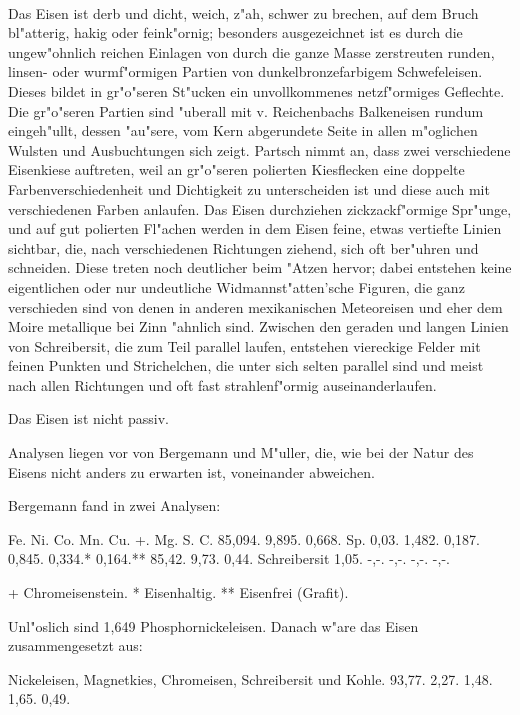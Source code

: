 \documentclass[a4paper, 11pt, oneside]{article}
\begin{document}
\paragraph{}
Das Eisen ist derb und dicht, weich, z"ah, schwer zu brechen, auf dem Bruch bl"atterig, hakig oder feink"ornig; besonders ausgezeichnet ist es durch die ungew"ohnlich reichen Einlagen von durch die ganze Masse zerstreuten runden, linsen- oder wurmf"ormigen Partien von dunkelbronzefarbigem Schwefeleisen. Dieses bildet in gr"o"seren St"ucken ein unvollkommenes netzf"ormiges Geflechte. Die gr"o"seren Partien sind "uberall mit v. Reichenbachs Balkeneisen rundum eingeh"ullt, dessen "au"sere, vom Kern abgerundete Seite in allen m"oglichen Wulsten und Ausbuchtungen sich zeigt. Partsch nimmt an, dass zwei verschiedene Eisenkiese auftreten, weil an gr"o"seren polierten Kiesflecken eine doppelte Farbenverschiedenheit und Dichtigkeit zu unterscheiden ist und diese auch mit verschiedenen Farben anlaufen. Das Eisen durchziehen zickzackf"ormige Spr"unge, und auf gut polierten Fl"achen werden in dem Eisen feine, etwas vertiefte Linien sichtbar, die, nach verschiedenen Richtungen ziehend, sich oft ber"uhren und schneiden. Diese treten noch deutlicher beim "Atzen hervor; dabei entstehen keine eigentlichen oder nur undeutliche Widmannst"atten'sche Figuren, die ganz verschieden sind von denen in anderen mexikanischen Meteoreisen und eher dem Moire metallique bei Zinn "ahnlich sind. Zwischen den geraden und langen Linien von Schreibersit, die zum Teil parallel laufen, entstehen viereckige Felder mit feinen Punkten und Strichelchen, die unter sich selten parallel sind und meist nach allen Richtungen und oft fast strahlenf"ormig auseinanderlaufen.

Das Eisen ist nicht passiv.

Analysen liegen vor von Bergemann und M"uller, die, wie bei der Natur des Eisens nicht anders zu erwarten ist, voneinander abweichen.

Bergemann fand in zwei Analysen:

Fe. Ni. Co. Mn. Cu. +. Mg. S. C.  
85,094. 9,895. 0,668. Sp. 0,03. 1,482. 0,187. 0,845. {0,334.* 0,164.**}  
85,42. 9,73. 0,44. Schreibersit 1,05. -,-. -,-. -,-. -,-.

+ Chromeisenstein.  
* Eisenhaltig.  
** Eisenfrei (Grafit).

Unl"oslich sind 1,649 Phosphornickeleisen. Danach w"are das Eisen zusammengesetzt aus:

Nickeleisen, Magnetkies, Chromeisen, Schreibersit und Kohle.  
93,77. 2,27. 1,48. 1,65. 0,49.
\end{document}
